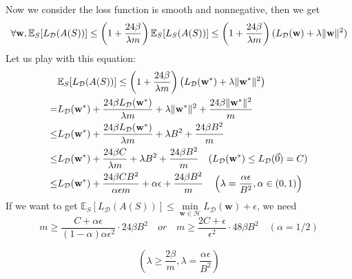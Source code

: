 Now we consider the loss function is smooth and nonnegative, then we get
\[ 
	\forall \mathbf{w}, 
	\mathbb{E}_S[L_\mathcal{D}(A(S))]
	\le \left( 1+\frac{24\beta}{\lambda m} \right) \mathbb{E}_S [L_S(A(S))]
	\le \left( 1+\frac{24\beta}{\lambda m} \right) 
	(L_\mathcal{D}(\mathbf{w})+\lambda \Arrowvert \mathbf{w} \Arrowvert^2)
\]
Let us play with this equation:
\[
	\begin{aligned}
		&\mathbb{E}_S[L_\mathcal{D}(A(S))] \le \left( 1 + \frac{24\beta}{\lambda m} \right)
		\left( L_\mathcal{D}(\mathbf{w^*}) + \lambda \Arrowvert \mathbf{w^*} \Arrowvert^2 \right)\\
		=& L_\mathcal{D}(\mathbf{w^*}) + 
		\frac{24 \beta L_\mathcal{D}(\mathbf{w^*})}{\lambda m} + \lambda \Arrowvert \mathbf{w^*} \Arrowvert^2
		+ \frac{24\beta \Arrowvert \mathbf{w^*} \Arrowvert^2}{m} \\
		\le& L_\mathcal{D}(\mathbf{w^*}) + 
		\frac{24 \beta L_\mathcal{D}(\mathbf{w^*})}{\lambda m} + \lambda B^2
		+ \frac{24\beta B^2}{m} \\
		\le& L_\mathcal{D}(\mathbf{w^*}) + 
		\frac{24 \beta C}{\lambda m} + \lambda B^2
        + \frac{24\beta B^2}{m} \quad (L_\mathcal{D}(\mathbf{w^*}) \le L_ \mathcal{D}( \vec{0} ) = C) \\
		\le& L_\mathcal{D}(\mathbf{w^*}) + 
		\frac{24 \beta C B^2}{\alpha \epsilon m} + \alpha \epsilon
		+ \frac{24\beta B^2}{m} \quad \left(\lambda = \frac{\alpha\epsilon}{B^2}, \alpha \in (0,1)\right)
	\end{aligned}
\]
If we want to get
$ \mathbb{E}_S [L_\mathcal{D}(A(S))] \le \min\limits_{\mathbf{w} \in \mathcal{H}} L_\mathcal{D}(\mathbf{w}) + \epsilon $, 
we need
\[ 
	m \ge \frac{C + \alpha \epsilon}{ (1-\alpha)\alpha \epsilon^2} \cdot 24 \beta B^2
	\quad or \quad
	m \ge \frac{2C + \epsilon}{\epsilon^2} \cdot 48 \beta B^2 \quad ( \alpha = 1/2)
\]

\[
    \left( \lambda \ge \frac{2 \beta}{m}, \lambda = \frac{\alpha \epsilon}{B^2} \right)
\]


